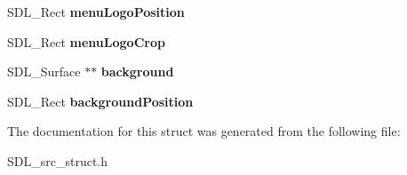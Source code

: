 \begin{DoxyCompactItemize}
\item 
\mbox{\label{structMenu_a44028594dd9fbdb584b145b08d8984e4}} 
S\+D\+L\+\_\+\+Rect {\bfseries menu\+Logo\+Position}
\item 
\mbox{\label{structMenu_aa5370ac0ac889cb35b4cdf96a2de4a89}} 
S\+D\+L\+\_\+\+Rect {\bfseries menu\+Logo\+Crop}
\item 
\mbox{\label{structMenu_a7ec6851118a11d54ac1963d488bbb5cb}} 
S\+D\+L\+\_\+\+Surface $\ast$$\ast$ {\bfseries background}
\item 
\mbox{\label{structMenu_a9c8a65d7ff9e74cfd8df6a56c39fb426}} 
S\+D\+L\+\_\+\+Rect {\bfseries background\+Position}
\end{DoxyCompactItemize}


The documentation for this struct was generated from the following file\+:\begin{DoxyCompactItemize}
\item 
S\+D\+L\+\_\+src\+\_\+struct.\+h\end{DoxyCompactItemize}
